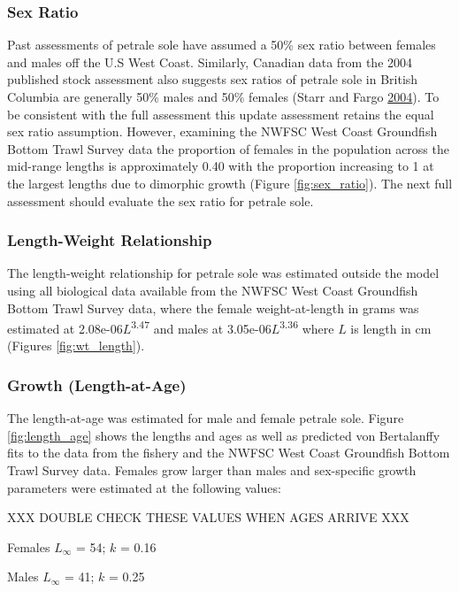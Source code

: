 \documentclass[12pt,]{article}
\begin{document}
\subsubsection{Sex Ratio}\label{sex-ratio}

Past assessments of petrale sole have assumed a 50\% sex ratio between
females and males off the U.S West Coast. Similarly, Canadian data from
the 2004 published stock assessment also suggests sex ratios of petrale
sole in British Columbia are generally 50\% males and 50\% females
(Starr and Fargo \protect\hyperlink{ref-starr_petrale_2004}{2004}). To
be consistent with the full assessment this update assessment retains
the equal sex ratio assumption. However, examining the NWFSC West Coast
Groundfish Bottom Trawl Survey data the proportion of females in the
population across the mid-range lengths is approximately 0.40 with the
proportion increasing to 1 at the largest lengths due to dimorphic
growth (Figure \ref{fig:sex_ratio}). The next full assessment should
evaluate the sex ratio for petrale sole.

\subsubsection{Length-Weight
Relationship}\label{length-weight-relationship}

The length-weight relationship for petrale sole was estimated outside
the model using all biological data available from the NWFSC West Coast
Groundfish Bottom Trawl Survey data, where the female weight-at-length
in grams was estimated at 2.08e-06\(L\)\textsuperscript{3.47} and males
at 3.05e-06\(L\)\textsuperscript{3.36} where \(L\) is length in cm
(Figures \ref{fig:wt_length}).

\subsubsection{Growth (Length-at-Age)}\label{growth-length-at-age}

The length-at-age was estimated for male and female petrale sole. Figure
\ref{fig:length_age} shows the lengths and ages as well as predicted von
Bertalanffy fits to the data from the fishery and the NWFSC West Coast
Groundfish Bottom Trawl Survey data. Females grow larger than males and
sex-specific growth parameters were estimated at the following values:

XXX DOUBLE CHECK THESE VALUES WHEN AGES ARRIVE XXX

\begin{centering}

Females $L_{\infty}$ = 54; $k$ = 0.16

Males $L_{\infty}$ = 41; $k$ = 0.25

\end{centering}
\end{document}
